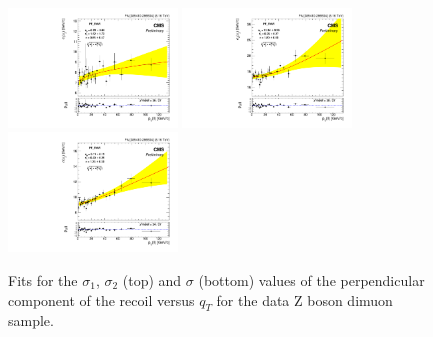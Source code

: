 \begin{figure} [h!]
\begin{center}
\includegraphics[width=0.4\textwidth]{Figures/WBoson/Analysis/Correction/Recoil/RecoilFitsqT/Data/fitPFu2sigma1.pdf}
\includegraphics[width=0.4\textwidth]{Figures/WBoson/Analysis/Correction/Recoil/RecoilFitsqT/Data/fitPFu2sigma2.pdf} \\
\includegraphics[width=0.4\textwidth]{Figures/WBoson/Analysis/Correction/Recoil/RecoilFitsqT/Data/fitPFu2sigma.pdf}
\caption{Fits for the $\sigma_{1}$,  $\sigma_{2}$ (top) and $\sigma$ (bottom) values of the perpendicular component of the recoil versus $q_{T}$ for the data Z boson dimuon sample.}
\label{fig:figU2RecoilResolutionFit_data}
\end{center}
\end{figure}

